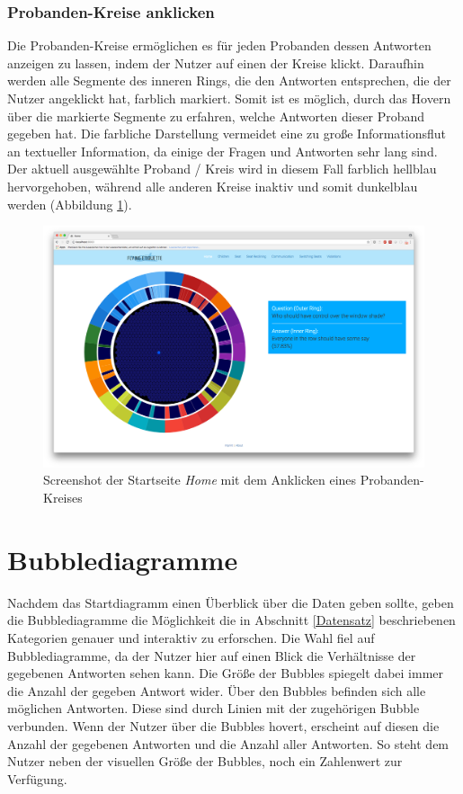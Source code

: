 \documentclass{mi-seminar}
\begin{document}
\subsubsection{Probanden-Kreise anklicken}
Die Probanden-Kreise ermöglichen es für jeden Probanden dessen Antworten anzeigen zu lassen, indem der Nutzer auf einen der Kreise klickt. Daraufhin werden alle Segmente des inneren Rings, die den Antworten entsprechen, die der Nutzer angeklickt hat, farblich markiert. Somit ist es möglich, durch das Hovern über die markierte Segmente zu erfahren, welche Antworten dieser Proband gegeben hat. Die farbliche Darstellung vermeidet eine zu große Informationsflut an textueller Information, da einige der Fragen und Antworten sehr lang sind. Der aktuell ausgewählte Proband / Kreis wird in diesem Fall farblich hellblau hervorgehoben, während alle anderen Kreise inaktiv und somit dunkelblau werden (Abbildung \ref{ScStartDiagramDotClick}).
\begin{figure}[h]
\includegraphics[scale=0.3]{assets/start_click_participant_dot.png}
\caption{Screenshot der Startseite \textit{Home} mit dem Anklicken eines Probanden-Kreises}
\label{ScStartDiagramDotClick}
\end{figure}

\section{Bubblediagramme}
\FloatBarrier
Nachdem das Startdiagramm einen Überblick über die Daten geben sollte, geben die Bubblediagramme die Möglichkeit die in Abschnitt \ref{Datensatz} beschriebenen Kategorien genauer und interaktiv zu erforschen.
Die Wahl fiel auf Bubblediagramme, da der Nutzer hier auf einen Blick die Verhältnisse der gegebenen Antworten sehen kann. Die Größe der Bubbles spiegelt dabei immer die Anzahl der gegeben Antwort wider. Über den Bubbles befinden sich alle möglichen Antworten. Diese sind durch Linien mit der zugehörigen Bubble verbunden. Wenn der Nutzer über die Bubbles hovert, erscheint auf diesen die Anzahl der gegebenen Antworten und die Anzahl aller Antworten. So steht dem Nutzer neben der visuellen Größe der Bubbles, noch ein Zahlenwert zur Verfügung. 
\end{document}
